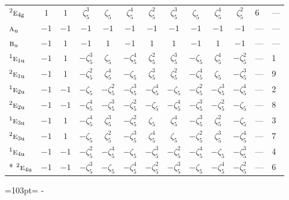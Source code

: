 \documentclass[10pt,a4paper]{article}
\newcommand{\needspace}[1]{\par\penalty-100\begingroup\dimen0=#1\relax\dimen2=\pagegoal
  \advance\dimen2-\pagetotal\ifdim\dimen0>\dimen2\relax\ifdim\dimen2>0pt\vfil\break\fi\fi
  \endgroup}
\numberwithin{equation}{section}
\newcommand{\irr}[1]{\text{\normalfont\scshape #1}}
\newcommand{\conjpair}[1]{{}^{#1}}
\newcommand{\ptag}[1]{\mathrm{#1}}
\newcommand{\rootunity}[1]{\zeta_{#1}}
\begin{document}
{\begin{longtable}{@{}lccccccccccll@{}}
$\conjpair{2}\irr{e}_{4\ptag{g}}$ & $1$ & $1$ & $\rootunity{5}^{3}$ & $\rootunity{5}$ & $\rootunity{5}^{4}$ & $\rootunity{5}^{2}$ & $\rootunity{5}^{3}$ & $\rootunity{5}$ & $\rootunity{5}^{4}$ & $\rootunity{5}^{2}$ & 6 & ---\\
$\irr{a}_{\ptag{u}}$ & $-1$ & $-1$ & $-1$ & $-1$ & $-1$ & $-1$ & $-1$ & $-1$ & $-1$ & $-1$ & --- & ---\\
$\irr{b}_{\ptag{u}}$ & $-1$ & $1$ & $-1$ & $1$ & $-1$ & $1$ & $1$ & $-1$ & $1$ & $-1$ & --- & ---\\
$\conjpair{1}\irr{e}_{1\ptag{u}}$ & $-1$ & $1$ & $-\rootunity{5}^{3}$ & $\rootunity{5}$ & $-\rootunity{5}^{4}$ & $\rootunity{5}^{2}$ & $\rootunity{5}^{3}$ & $-\rootunity{5}$ & $\rootunity{5}^{4}$ & $-\rootunity{5}^{2}$ & --- & 1\\
$\conjpair{2}\irr{e}_{1\ptag{u}}$ & $-1$ & $1$ & $-\rootunity{5}^{2}$ & $\rootunity{5}^{4}$ & $-\rootunity{5}$ & $\rootunity{5}^{3}$ & $\rootunity{5}^{2}$ & $-\rootunity{5}^{4}$ & $\rootunity{5}$ & $-\rootunity{5}^{3}$ & --- & 9\\
$\conjpair{1}\irr{e}_{2\ptag{u}}$ & $-1$ & $-1$ & $-\rootunity{5}$ & $-\rootunity{5}^{2}$ & $-\rootunity{5}^{3}$ & $-\rootunity{5}^{4}$ & $-\rootunity{5}$ & $-\rootunity{5}^{2}$ & $-\rootunity{5}^{3}$ & $-\rootunity{5}^{4}$ & --- & 2\\
$\conjpair{2}\irr{e}_{2\ptag{u}}$ & $-1$ & $-1$ & $-\rootunity{5}^{4}$ & $-\rootunity{5}^{3}$ & $-\rootunity{5}^{2}$ & $-\rootunity{5}$ & $-\rootunity{5}^{4}$ & $-\rootunity{5}^{3}$ & $-\rootunity{5}^{2}$ & $-\rootunity{5}$ & --- & 8\\
$\conjpair{1}\irr{e}_{3\ptag{u}}$ & $-1$ & $1$ & $-\rootunity{5}^{4}$ & $\rootunity{5}^{3}$ & $-\rootunity{5}^{2}$ & $\rootunity{5}$ & $\rootunity{5}^{4}$ & $-\rootunity{5}^{3}$ & $\rootunity{5}^{2}$ & $-\rootunity{5}$ & --- & 3\\
$\conjpair{2}\irr{e}_{3\ptag{u}}$ & $-1$ & $1$ & $-\rootunity{5}$ & $\rootunity{5}^{2}$ & $-\rootunity{5}^{3}$ & $\rootunity{5}^{4}$ & $\rootunity{5}$ & $-\rootunity{5}^{2}$ & $\rootunity{5}^{3}$ & $-\rootunity{5}^{4}$ & --- & 7\\
$\conjpair{1}\irr{e}_{4\ptag{u}}$ & $-1$ & $-1$ & $-\rootunity{5}^{2}$ & $-\rootunity{5}^{4}$ & $-\rootunity{5}$ & $-\rootunity{5}^{3}$ & $-\rootunity{5}^{2}$ & $-\rootunity{5}^{4}$ & $-\rootunity{5}$ & $-\rootunity{5}^{3}$ & --- & 4\\*
$\conjpair{2}\irr{e}_{4\ptag{u}}$ & $-1$ & $-1$ & $-\rootunity{5}^{3}$ & $-\rootunity{5}$ & $-\rootunity{5}^{4}$ & $-\rootunity{5}^{2}$ & $-\rootunity{5}^{3}$ & $-\rootunity{5}$ & $-\rootunity{5}^{4}$ & $-\rootunity{5}^{2}$ & --- & 6\\
\bottomrule\end{longtable}}
\needspace{103pt}
\end{document}
